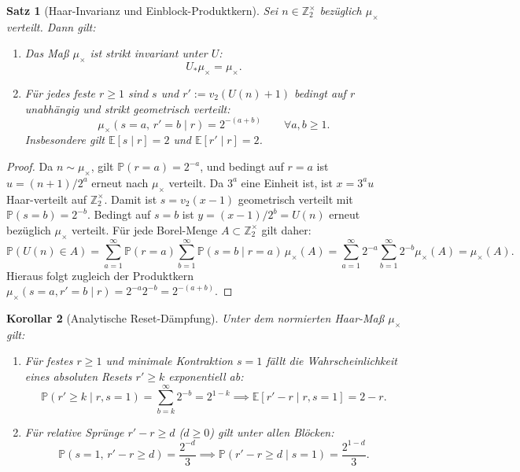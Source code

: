 \documentclass[11pt,reqno]{amsart}
\newtheorem{theorem}{Satz}[section]
\newtheorem{corollary}[theorem]{Korollar}
\theoremstyle{definition}
\theoremstyle{remark}
\numberwithin{equation}{section}
\begin{document}
\begin{theorem}[Haar-Invarianz und Einblock-Produktkern]
\label{thm:haar_block_kernel}
Sei $n \in \mathbb{Z}_2^\times$ bez\"uglich $\mu_\times$ verteilt. Dann gilt:
\begin{enumerate}
\item Das Ma\ss{} $\mu_\times$ ist strikt invariant unter $U$:
\begin{equation}
U_* \mu_\times = \mu_\times.
\end{equation}
\item F\"ur jedes feste $r \ge 1$ sind $s$ und $r' := v_2(U(n)+1)$ bedingt auf $r$ unabh\"angig und strikt geometrisch verteilt:
\begin{equation}
\mu_\times(s = a, \, r' = b \mid r) = 2^{-(a+b)} \qquad \forall a, b \ge 1.
\end{equation}
Insbesondere gilt $\mathbb{E}[s \mid r] = 2$ und $\mathbb{E}[r' \mid r] = 2$.
\end{enumerate}
\end{theorem}

\begin{proof}
Da $n \sim \mu_\times$, gilt $\mathbb{P}(r = a) = 2^{-a}$, und bedingt auf $r = a$ ist $u = (n+1)/2^a$ erneut nach $\mu_\times$ verteilt. 
Da $3^a$ eine Einheit ist, ist $x = 3^a u$ Haar-verteilt auf $\mathbb{Z}_2^\times$. 
Damit ist $s = v_2(x-1)$ geometrisch verteilt mit $\mathbb{P}(s=b) = 2^{-b}$. 
Bedingt auf $s=b$ ist $y = (x-1)/2^b = U(n)$ erneut bez\"uglich $\mu_\times$ verteilt. 
F\"ur jede Borel-Menge $A \subset \mathbb{Z}_2^\times$ gilt daher:
\begin{equation}
\mathbb{P}(U(n) \in A) = \sum_{a=1}^\infty \mathbb{P}(r = a) \sum_{b=1}^\infty \mathbb{P}(s = b \mid r=a) \, \mu_\times(A) = \sum_{a=1}^\infty 2^{-a} \sum_{b=1}^\infty 2^{-b} \mu_\times(A) = \mu_\times(A).
\end{equation}
Hieraus folgt zugleich der Produktkern $\mu_\times(s=a, r'=b \mid r) = 2^{-a} 2^{-b} = 2^{-(a+b)}$.
\end{proof}

\begin{corollary}[Analytische Reset-D\"ampfung]
\label{cor:reset_tail}
Unter dem normierten Haar-Ma\ss{} $\mu_\times$ gilt:
\begin{enumerate}
\item F\"ur festes $r \ge 1$ und minimale Kontraktion $s = 1$ f\"allt die Wahrscheinlichkeit eines absoluten Resets $r' \ge k$ exponentiell ab:
\begin{equation}
\mathbb{P}(r' \ge k \mid r, s = 1) = \sum_{b=k}^\infty 2^{-b} = 2^{1-k} \implies \mathbb{E}[r' - r \mid r, s = 1] = 2 - r.
\end{equation}
\item F\"ur relative Spr\"unge $r' - r \ge d$ ($d \ge 0$) gilt unter allen Bl\"ocken:
\begin{equation}
\mathbb{P}(s = 1, \, r' - r \ge d) = \frac{2^{-d}}{3} \implies \mathbb{P}(r' - r \ge d \mid s = 1) = \frac{2^{1-d}}{3}.
\end{equation}
\end{enumerate}
\end{corollary}
\end{document}
